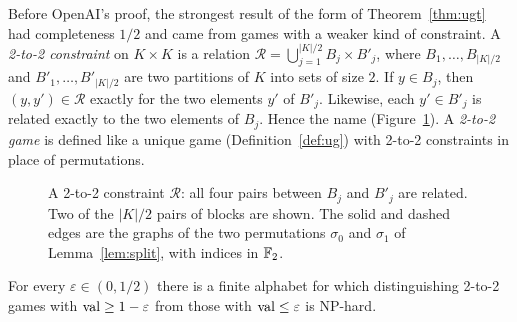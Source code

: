 Before OpenAI's proof, the strongest result of the form of Theorem~\ref{thm:ugt} had completeness $1/2$ \cite[Theorem~2.20]{Khot19} and came from games with a weaker kind of constraint. A \emph{2-to-2 constraint} on $K\times K$ is a relation $\mathcal R=\bigcup_{j=1}^{|K|/2}B_j\times B'_j$, where $B_1,\dots,B_{|K|/2}$ and $B'_1,\dots,B'_{|K|/2}$ are two partitions of $K$ into sets of size $2$. If $y\in B_j$, then $(y,y')\in\mathcal R$ exactly for the two elements $y'$ of $B'_j$. Likewise, each $y'\in B'_j$ is related exactly to the two elements of $B_j$. Hence the name (Figure~\ref{fig:twotwodef}). A \emph{2-to-2 game} is defined like a unique game (Definition~\ref{def:ug}) with 2-to-2 constraints in place of permutations.

\begin{figure}[ht]
\centering
{}
\caption{A 2-to-2 constraint $\mathcal R$: all four pairs between $B_j$ and $B'_j$ are related. Two of the $|K|/2$ pairs of blocks are shown. The solid and dashed edges are the graphs of the two permutations $\sigma_0$ and $\sigma_1$ of Lemma~\ref{lem:split}, with indices in $\mathbb{F}_2$.}\label{fig:twotwodef}
\end{figure}

\begin{theorem}\label{thm:2to2}
For every $\varepsilon\in(0,1/2)$ there is a finite alphabet for which distinguishing 2-to-2 games with $\operatorname{val}\ge1-\varepsilon$ from those with $\operatorname{val}\le\varepsilon$ is NP-hard.
\end{theorem}

